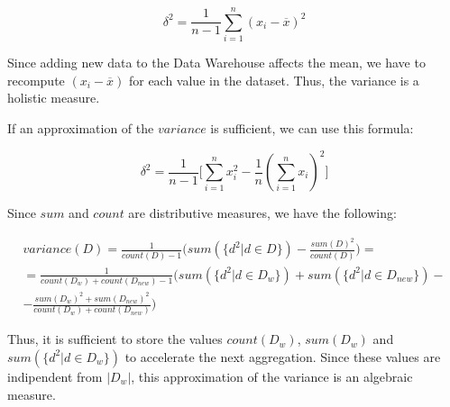 \documentclass{scrartcl}
\begin{document}
$$ \delta^2 = \frac{1}{n-1} \sum\limits_{i=1}^n (x_i - \overline{x})^2 $$

\bigskip
Since adding new data to the Data Warehouse affects the mean, we have to recompute $(x_i - \overline{x})$ for each value in the dataset. Thus, the variance is a holistic measure.

\bigskip
If an approximation of the $variance$ is sufficient, we can use this formula:

$$ \delta^2 = \frac{1}{n-1} \Big[ \sum\limits_{i=1}^n x_i^2 - \frac{1}{n}(\sum\limits_{i=1}^n x_i)^2 \Big] $$

\bigskip
Since $sum$ and $count$ are distributive measures, we have the following:

\begin{multline*}
variance(D) = \frac{1}{count(D) - 1} \Big( sum(\{d^2 | d \in D\}) - \frac{sum(D)^2}{count(D)} \Big) = \\
= \frac{1}{count(D_{w}) + count(D_{new}) - 1} \Big( sum(\{d^2 | d \in D_{w}\}) + sum(\{d^2 | d \in D_{new}\}) - \\
- \frac{sum(D_{w})^2 + sum(D_{new})^2}{count(D_{w}) + count(D_{new}) } \Big)
\end{multline*}

\bigskip
Thus, it is sufficient to store the values $count(D_{w})$, $sum(D_{w})$ and $sum(\{d^2 | d \in D_{w}\})$ to accelerate the next aggregation. Since these values are indipendent from $|D_{w}|$, this approximation of the variance is an algebraic measure.
\end{document}

